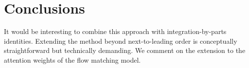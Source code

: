 \section{Conclusions}\label{sec:conclusions}

It would be interesting to combine this approach with
integration-by-parts identities. Extending the method beyond
next-to-leading order is conceptually straightforward but technically
demanding. We comment on the extension to the attention weights of the
flow matching model.

